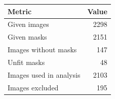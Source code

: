 \begin{tabular}{lr}
\toprule
Metric & Value \\
\midrule
Given images & 2298 \\
Given masks & 2151 \\
Images without masks & 147 \\
Unfit masks & 48 \\
Images used in analysis & 2103 \\
Images excluded & 195 \\
\bottomrule
\end{tabular}
